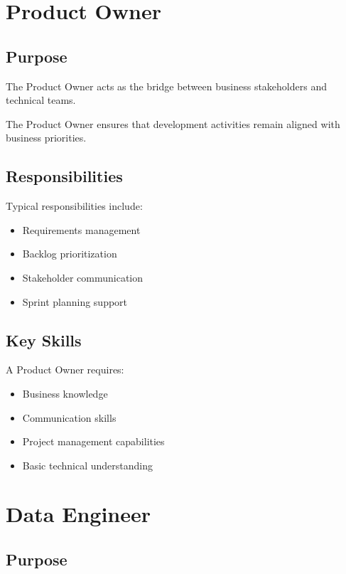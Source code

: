 \section{Product Owner}

\subsection{Purpose}

The Product Owner acts as the bridge between business stakeholders and technical teams.

The Product Owner ensures that development activities remain aligned with business priorities.

\subsection{Responsibilities}

Typical responsibilities include:

\begin{itemize}
    \item Requirements management
    \item Backlog prioritization
    \item Stakeholder communication
    \item Sprint planning support
\end{itemize}

\subsection{Key Skills}

A Product Owner requires:

\begin{itemize}
    \item Business knowledge
    \item Communication skills
    \item Project management capabilities
    \item Basic technical understanding
\end{itemize}

\section{Data Engineer}

\subsection{Purpose}

